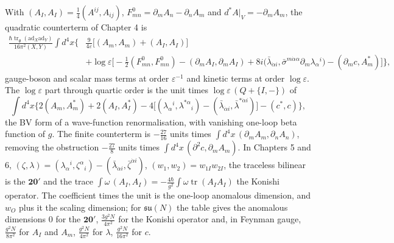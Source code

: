 \begin{remark}
With $(A_I,A_I)=\tfrac14(A^{ij},A_{ij})$, $F^0_{mn}=\partial_mA_n-\partial_nA_m$ and $d^*A|_V=-\partial_mA_m$, the quadratic counterterm of Chapter 4 is
\[
\begin{aligned}
\frac{\hbar\operatorname{tr}_{\mathfrak g}(\mathrm{ad}_X\mathrm{ad}_Y)}{16\pi^2(X,Y)}\int d^4x\Big\{&\frac9{4\varepsilon}\big[(A_m,A_m)+(A_I,A_I)\big]\\
&+\log\varepsilon\Big[-\tfrac12(F^0_{mn},F^0_{mn})-(\partial_mA_I,\partial_mA_I)+8i\big(\bar\lambda_{\dot\alpha i},\bar\sigma^{m\dot\alpha\alpha}\partial_m\lambda_\alpha{}^i\big)-(\partial_mc,A^*_m)\Big]\Big\},
\end{aligned}
\]
gauge-boson and scalar mass terms at order $\varepsilon^{-1}$ and kinetic terms at order $\log\varepsilon$. The $\log\varepsilon$ part through quartic order is the unit times $\log\varepsilon\,(Q+\{I,-\})$ of
\[
\int d^4x\Big\{2(A_m,A^*_m)+2(A_I,A^*_I)-4\big[(\lambda_\alpha{}^i,\lambda^{*\alpha}{}_i)-(\bar\lambda_{\dot\alpha i},\bar\lambda^{*\dot\alpha i})\big]-(c^*,c)\Big\},
\]
the BV form of a wave-function renormalisation, with vanishing one-loop beta function of $g$. The finite counterterm is $-\tfrac{27}{16}$ units times $\int d^4x\,(\partial_mA_m,\partial_nA_n)$, removing the obstruction $-\tfrac{27}{8}$ units times $\int d^4x\,(\partial^2c,\partial_mA_m)$. In Chapters 5 and 6, $(\zeta,\lambda)=(\lambda_\alpha{}^i,\zeta^\alpha{}_i)-(\bar\lambda_{\dot\alpha i},\bar\zeta^{\dot\alpha i})$, $(w_1,w_2)=w_{1I}w_{2I}$, the traceless bilinear is the $\mathbf{20'}$ and the trace $\int\omega\,(A_I,A_I)=-\tfrac{4\hbar}{g^2}\int\omega\operatorname{tr}(A_IA_I)$ the Konishi operator. The coefficient times the unit is the one-loop anomalous dimension, and $w_O$ plus it the scaling dimension; for $\mathfrak{su}(N)$ the table gives the anomalous dimensions $0$ for the $\mathbf{20'}$, $\tfrac{3g^2N}{4\pi^2}$ for the Konishi operator and, in Feynman gauge, $\tfrac{g^2N}{8\pi^2}$ for $A_I$ and $A_m$, $\tfrac{g^2N}{4\pi^2}$ for $\lambda$, $\tfrac{g^2N}{16\pi^2}$ for $c$.
\end{remark}
